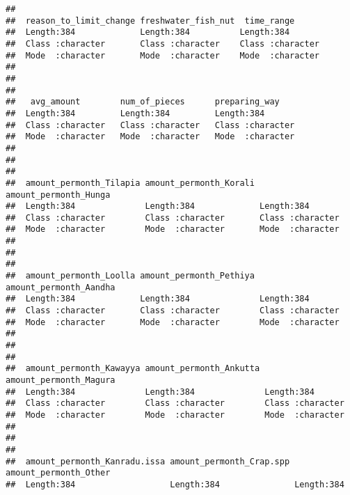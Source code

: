 \documentclass[
]{article}
\begin{document}
\begin{verbatim}
##                                                              
##  reason_to_limit_change freshwater_fish_nut  time_range       
##  Length:384             Length:384          Length:384        
##  Class :character       Class :character    Class :character  
##  Mode  :character       Mode  :character    Mode  :character  
##                                                               
##                                                               
##                                                               
##   avg_amount        num_of_pieces      preparing_way     
##  Length:384         Length:384         Length:384        
##  Class :character   Class :character   Class :character  
##  Mode  :character   Mode  :character   Mode  :character  
##                                                          
##                                                          
##                                                          
##  amount_permonth_Tilapia amount_permonth_Korali amount_permonth_Hunga
##  Length:384              Length:384             Length:384           
##  Class :character        Class :character       Class :character     
##  Mode  :character        Mode  :character       Mode  :character     
##                                                                      
##                                                                      
##                                                                      
##  amount_permonth_Loolla amount_permonth_Pethiya amount_permonth_Aandha
##  Length:384             Length:384              Length:384            
##  Class :character       Class :character        Class :character      
##  Mode  :character       Mode  :character        Mode  :character      
##                                                                       
##                                                                       
##                                                                       
##  amount_permonth_Kawayya amount_permonth_Ankutta amount_permonth_Magura
##  Length:384              Length:384              Length:384            
##  Class :character        Class :character        Class :character      
##  Mode  :character        Mode  :character        Mode  :character      
##                                                                        
##                                                                        
##                                                                        
##  amount_permonth_Kanradu.issa amount_permonth_Crap.spp amount_permonth_Other
##  Length:384                   Length:384               Length:384           

\end{verbatim}
\end{document}
